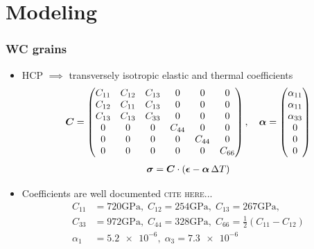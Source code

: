 \documentclass[11pt]{beamer} %
\begin{document}
\section{Modeling}
\begin{frame}
 \frametitle{WC grains}
  \begin{itemize}
  \item HCP $\implies$ transversely isotropic elastic and thermal coefficients
  \begin{align*}
   \boldsymbol{C} = \begin{pmatrix} C_{11} & C_{12} & C_{13} & 0 & 0 & 0 \\
                                C_{12} & C_{11} & C_{13} & 0 & 0 & 0 \\
                                C_{13} & C_{13} & C_{33} & 0 & 0 & 0 \\
                                0 & 0 & 0 & C_{44} & 0 & 0 \\
                                0 & 0 & 0 & 0 & C_{44} & 0 \\
                                0 & 0 & 0 & 0 & 0 & C_{66} \\
                \end{pmatrix}, \quad
    \boldsymbol{\alpha} = \begin{pmatrix} \alpha_{11} \\ \alpha_{11} \\ \alpha_{33} \\ 0 \\ 0 \\ 0 \end{pmatrix}
  \end{align*}
  \begin{align*}
    \boldsymbol{\sigma} = \boldsymbol{C} \cdot (\boldsymbol{\epsilon} - \boldsymbol{\alpha} \, \Delta T)
  \end{align*}
  \item Coefficients are well documented \textsc{cite here...}
  \begin{align*}
     C_{11} &= 720\si{\giga\pascal},\; C_{12} = 254\si{\giga\pascal},\; C_{13} = 267\si{\giga\pascal}, \\
     C_{33} &= 972\si{\giga\pascal},\; C_{44} = 328\si{\giga\pascal},\; C_{66} = \frac12 (C_{11}-C_{12})
     \\
     \alpha_1 &= \num{5.2e-6},\; \alpha_3 = \num{7.3e-6}
  \end{align*}
  \end{itemize}
\end{frame}
\end{document}
